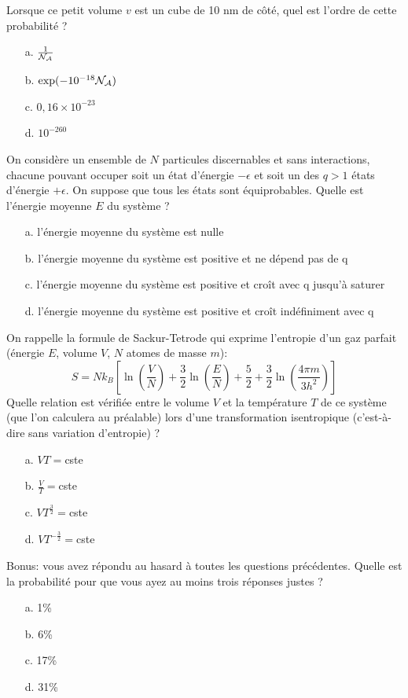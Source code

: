 \question
Lorsque ce petit volume $v$ est un cube de 10 nm de côté, quel est l'ordre de cette probabilité ?
\begin{itemize}
\item[a.] $\frac{1}{{\cal N_A}}$
\item[b.] $\exp(-10^{-18}{\cal N_A})$
\item[c.] $0,16\times 10^{-23}$
\item[d.] $10^{-260}$
\end{itemize}

\question
On considère un ensemble de $N$ particules discernables et sans interactions, chacune pouvant occuper soit un état d'énergie $-\epsilon$ et soit un des $q>1$ états d'énergie $+\epsilon$. On suppose que tous les états sont équiprobables. Quelle est l'énergie moyenne $E$ du système ?
\begin{itemize}
\item[a.] l'énergie moyenne du système est nulle
\item[b.] l'énergie moyenne du système est positive et ne dépend pas de q
\item[c.] l'énergie moyenne du système est positive et croît avec q jusqu'à saturer
\item[d.] l'énergie moyenne du système est positive et croît indéfiniment avec q
\end{itemize}

\question
On rappelle la formule de Sackur-Tetrode qui exprime l'entropie d'un gaz parfait (énergie $E$, volume $V$, $N$ atomes de masse $m$):
$$
S=N k_B\left[ \ln (\frac{V}{N})+\frac{3}{2} \ln( \frac{E}{N})+\frac{5}{2}+\frac{3}{2} \ln(\frac{4\pi m}{3 h^2})\right]
$$
Quelle relation est vérifiée entre le volume $V$ et la température $T$ de ce système (que l'on calculera au préalable) lors d'une transformation isentropique (c'est-à-dire sans variation d'entropie) ?
\begin{itemize}
\item[a.] $VT=$cste
\item[b.] $\frac{V}{T}=$cste
\item[c.] $VT^{\frac{3}{2}}=$cste
\item[d.] $VT^{-\frac{3}{2}}=$cste
\end{itemize}

\question
Bonus: vous avez répondu au hasard à toutes les questions précédentes. Quelle est la probabilité pour que vous ayez au moins trois réponses justes ?
\begin{itemize}
\item[a.] 1\%
\item[b.] 6\%
\item[c.] 17\%
\item[d.] 31\%
\end{itemize}
